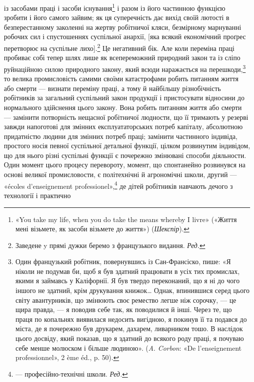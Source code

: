 \parcont{}  %
із засобами праці і засоби існування\footnote{
«You take my life, when you do take the means whereby I livre»
(«Життя мені візьмете, як засоби візьмете до життя») (\emph{Шекспір}).
} і разом із його частинною
функцією зробити і його самого зайвим; як ця суперечність дає
вихід своїй лютості в безперестанному заколенні на жертву
робітничої кляси, безмірному марнуванні робочих сил і спустошеннях
суспільної анархії, [яка всякий економічний проґрес
перетворює на суспільне лихо].\footnote*{
Заведене y прямі дужки беремо з французького видання. \emph{Ред.}
}  Це негативний бік. Але коли
переміна праці пробиває собі тепер шлях лише як всепереможний
природний закон та із сліпо руйнаційною силою природного закону,
який всюди наражається на перешкоди,\footnote{
Один французький робітник, повернувшись із Сан-Франсіско,
пише: «Я ніколи не подумав би, щоб я був здатний працювати в усіх
тих промислах, якими я займавсь у Каліфорнії. Я був твердо переконаний,
що я ні до чого іншого не здатний, крім друкування книжок\dots{} Однак,
впинившися серед цього світу авантурників, що змінюють своє ремество
легше ніж сорочку, — це щира правда, — я поводив себе так, як поводилися
й інші. Через те, що праця по копальнях виявилася недосить вигідною,
я покинув її та подався до міста, де я почережно був друкарем, дахарем,
ливарником тошо. В наслідок цього досвіду, який показав, що я здатний
до всякого роду праці, я почуваю себе менше молюском і більше людиною».
(\emph{A. Corbon}: «De l’enseignement professionnel», 2 ème éd., p. 50).
} то велика промисловість
самими своїми катастрофами робить питанням життя або
смерти — визнати переміну праці, а тому й найбільшу різнобічність
робітників за загальний суспільний закон продукції і
пристосувати відносини до нормального здійснення цього закону.
Вона робить питанням життя або смерти — замінити потворність
нещасної робітничої людности, що її тримають у резерві завжди
напоготові для змінних експлуататорських потреб капіталу,
абсолютною придатністю людини для змінних потреб праці;
замінити частинного індивіда, простого носія певної суспільної
детальної функції, цілком розвинутим індивідом, що для нього
різні суспільні функції є почережно змінювані способи діяльности.
Один момент цього процесу перевороту, момент, що спонтанейно
розвинувся на основі великої промисловости, є політехнічні й
агрономічні школи, другий — «écoles d’enseignement professionel»,\footnote*{
— професійно-технічні школи. \emph{Ред.}
}
де дітей робітників навчають дечого з технології і практично
